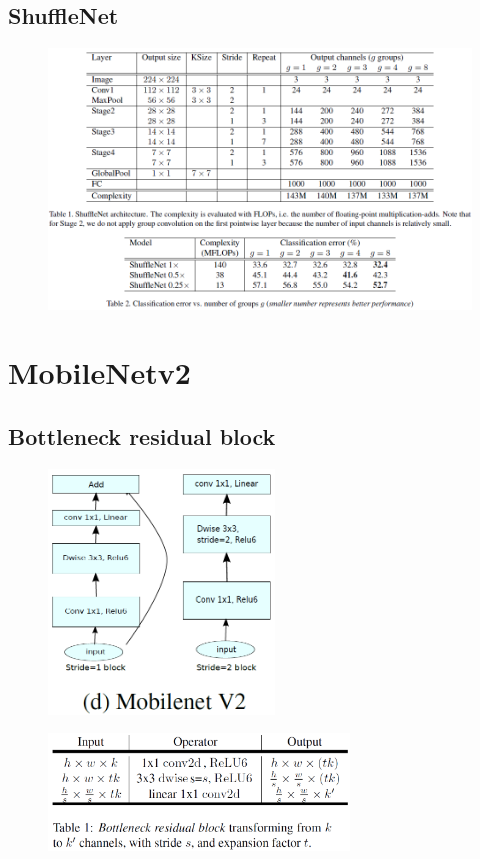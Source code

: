 \subsection{ShuffleNet}
\begin{figure}[H]
    \centering
    \includegraphics[width=16cm]{images/models/shufflenet.png}
    \label{fig:shufflenet}
\end{figure}

\section{MobileNetv2}

\subsection{Bottleneck residual block}

\begin{figure}[H]
    \centering
    \includegraphics[width=6cm]{images/models/mobilenetv2_block.png}
    \label{fig:mobilenetv2_block}
\end{figure}

\begin{figure}[H]
    \centering
    \includegraphics[width=8cm]{images/models/bottleneck_residual_block.png}
    \label{fig:bottleneck_residual_block}
\end{figure}


